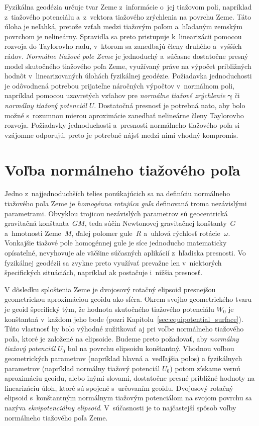 \documentclass[a4paper,12pt]{book}
\begin{document}
Fyzikálna geodézia určuje tvar Zeme z~informácie o~jej tiažovom poli, napríklad 
z~tiažového potenciálu a~z~vektora tiažového zrýchlenia na povrchu Zeme.  Táto 
úloha je neľahká, pretože vzťah medzi tiažovým poľom a~hľadaným zemským 
povrchom je nelineárny.  Spravidla sa preto pristupuje k~linearizácii pomocou 
rozvoja do Taylorovho radu, v~ktorom sa zanedbajú členy druhého a~vyšších 
rádov.  \emph{Normálne tiažové pole Zeme} je jednoduchý a~súčasne dostatočne 
presný model skutočného tiažového poľa Zeme, využívaný práve na výpočet 
približných hodnôt v~linearizovaných úlohách fyzikálnej geodézie.  Požiadavka 
jednoduchosti je odôvodnená potrebou prijateľne náročných výpočtov v~normálnom 
poli, napríklad pomocou uzavretých vzťahov pre \emph{normálne tiažové 
zrýchlenie} $\boldsymbol{\gamma}$ či \emph{normálny tiažový potenciál} $U$.  
Dostatočná presnosť je potrebná nato, aby bolo možné s~rozumnou mierou 
aproximácie zanedbať nelineárne členy Taylorovho rozvoja.  Požiadavky 
jednoduchosti a~presnosti normálneho tiažového poľa si vzájomne odporujú, preto 
je potrebné nájsť medzi nimi vhodný kompromis.

\section{Voľba normálneho tiažového poľa}
\label{sec:choice_of_normal_gravity_field}

Jedno z~najjednoduchších telies ponúkajúcich sa na definíciu normálneho 
tiažového poľa Zeme je \emph{homogénna rotujúca guľa} definovaná troma 
nezávislými parametrami.  Obvyklou trojicou nezávislých parametrov sú 
geocentrická gravitačná konštanta~$GM$, teda súčin Newtonovej gravitačnej 
konštanty~$G$ a~hmotnosti Zeme~$M$, ďalej polomer gule~$R$ a~uhlová rýchlosť 
rotácie~$\omega$.  Vonkajšie tiažové pole homogénnej gule je síce jednoducho 
matematicky opísateľné, nevyhovuje ale väčšine súčasných aplikácií z~hľadiska 
presnosti.  Vo fyzikálnej geodézii sa zvykne preto využívať prevažne len 
v~niektorých špecifických situáciách, napríklad ak postačuje i~nižšia presnosť.

V dôsledku sploštenia Zeme je dvojosový rotačný elipsoid presnejšou 
geometrickou aproximáciou geoidu ako sféra.  Okrem svojho geometrického tvaru 
je geoid špecifický tým, že hodnota skutočného tiažového potenciálu $W_0$ je 
konštantná v~každom jeho bode (pozri Kapitolu~\ref{sec:equipotential_surface}).  
Túto vlastnosť by bolo výhodné zužitkovať aj pri voľbe normálneho tiažového 
poľa, ktoré je založené na elipsoide.  Budeme preto požadovať, aby 
\emph{normálny tiažový potenciál} $U_0$ bol na povrchu elipsoidu konštantný.  
Vhodnou voľbou geometrických parametrov (napríklad hlavná a~vedľajšia polos) 
a fyzikálnych parametrov (napríklad normálny tiažový potenciál $U_0$) potom 
získame vernú aproximáciu geoidu, alebo inými slovami, dostatočne presné 
približné hodnoty na linearizáciu úloh, ktoré sú spojené s~určovaním geoidu.  
Dvojosový rotačný elipsoid s~konštantným normálnym tiažovým potenciálom na 
svojom povrchu sa nazýva \emph{ekvipotenciálny elipsoid}.  V~súčasnosti je to 
najčastejší spôsob voľby normálneho tiažového poľa Zeme.
\end{document}
